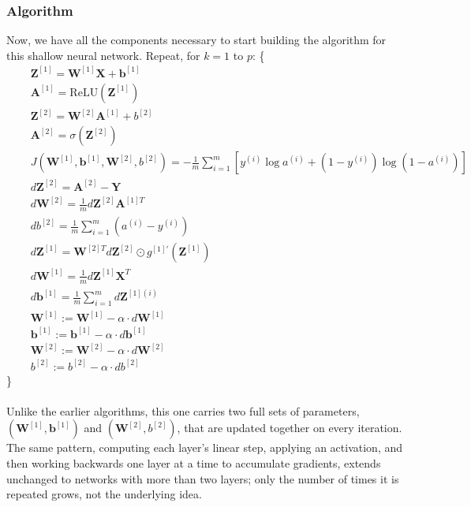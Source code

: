 \documentclass{article}
\begin{document}
\subsubsection{Algorithm}
Now, we have all the components necessary to start building the algorithm for this shallow neural network.
Repeat, for $k=1$ to $p$: \{
\begin{align*}
    &\quad \mathbf{Z}^{[1]} = \mathbf{W}^{[1]}\mathbf{X} + \mathbf{b}^{[1]} \\
    &\quad \mathbf{A}^{[1]}=\text{ReLU}(\mathbf{Z}^{[1]}) \\
    &\quad \mathbf{Z}^{[2]} = \mathbf{W}^{[2]}\mathbf{A}^{[1]} + b^{[2]} \\
    &\quad \mathbf{A}^{[2]}=\sigma(\mathbf{Z}^{[2]}) \\
    &\quad J(\mathbf{W}^{[1]},\mathbf{b}^{[1]},\mathbf{W}^{[2]},b^{[2]})= -\frac{1}{m} \sum_{i=1}^{m}[y^{(i)}\log a^{(i)} + (1-y^{(i)})\log{(1-a^{(i)})}] \\
    &\quad d\mathbf{Z}^{[2]} = \mathbf{A}^{[2]}-\mathbf{Y} \\
    &\quad d\mathbf{W}^{[2]}=\frac{1}{m}d\mathbf{Z}^{[2]}\mathbf{A}^{[1]T} \\
    &\quad db^{[2]}=\frac{1}{m}\sum_{i=1}^{m}(a^{(i)}-y^{(i)}) \\
    &\quad d\mathbf{Z}^{[1]} = \mathbf{W}^{[2]T} d\mathbf{Z}^{[2]} \odot g^{[1]\prime}(\mathbf{Z}^{[1]}) \\
    &\quad d\mathbf{W}^{[1]}=\frac{1}{m}d\mathbf{Z}^{[1]}\mathbf{X}^T \\
    &\quad d\mathbf{b}^{[1]}=\frac{1}{m}\sum_{i=1}^{m} d\mathbf{Z}^{[1](i)} \\
    &\quad \mathbf{W}^{[1]} := \mathbf{W}^{[1]} - \alpha \cdot d\mathbf{W}^{[1]} \\
    &\quad \mathbf{b}^{[1]}:=\mathbf{b}^{[1]} - \alpha \cdot d\mathbf{b}^{[1]} \\
    &\quad \mathbf{W}^{[2]} := \mathbf{W}^{[2]} - \alpha \cdot d\mathbf{W}^{[2]} \\
    &\quad b^{[2]}:=b^{[2]} - \alpha \cdot db^{[2]}
\end{align*}
\}
\\
\\
Unlike the earlier algorithms, this one carries two full sets of parameters, $(\mathbf{W}^{[1]}, \mathbf{b}^{[1]})$ and $(\mathbf{W}^{[2]}, b^{[2]})$, that are updated together on every iteration. The same pattern, computing each layer's linear step, applying an activation, and then working backwards one layer at a time to accumulate gradients, extends unchanged to networks with more than two layers; only the number of times it is repeated grows, not the underlying idea.
\end{document}
